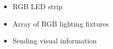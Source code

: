 
\begin{itemize}
    \item RGB LED strip
    \item Array of RGB lighting fixtures
    \item Sending visual information
\end{itemize}

